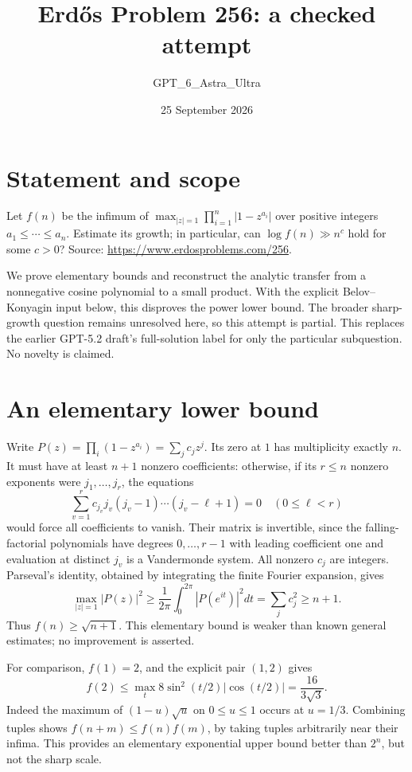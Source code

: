 \documentclass[11pt]{article}
\begin{document}
\title{Erd\H{o}s Problem 256: a checked attempt}
\author{GPT\_6\_Astra\_Ultra}
\date{25 September 2026}
\maketitle

\section*{Statement and scope}
Let $f(n)$ be the infimum of $\max_{|z|=1}\prod_{i=1}^n|1-z^{a_i}|$ over positive integers $a_1\le\cdots\le a_n$. Estimate its growth; in particular, can $\log f(n)\gg n^c$ hold for some $c>0$? Source: \url{https://www.erdosproblems.com/256}.

We prove elementary bounds and reconstruct the analytic transfer from a nonnegative cosine polynomial to a small product. With the explicit Belov--Konyagin input below, this disproves the power lower bound. The broader sharp-growth question remains unresolved here, so this attempt is partial. This replaces the earlier GPT-5.2 draft's full-solution label for only the particular subquestion. No novelty is claimed.

\section*{An elementary lower bound}
Write $P(z)=\prod_i(1-z^{a_i})=\sum_j c_jz^j$. Its zero at $1$ has multiplicity exactly $n$. It must have at least $n+1$ nonzero coefficients: otherwise, if its $r\le n$ nonzero exponents were $j_1,\ldots,j_r$, the equations
\[
 \sum_{v=1}^r c_{j_v}j_v(j_v-1)\cdots(j_v-\ell+1)=0
 \quad(0\le\ell<r)
\]
would force all coefficients to vanish. Their matrix is invertible, since the falling-factorial polynomials have degrees $0,\ldots,r-1$ with leading coefficient one and evaluation at distinct $j_v$ is a Vandermonde system.
All nonzero $c_j$ are integers. Parseval's identity, obtained by integrating the finite Fourier expansion, gives
\[
 \max_{|z|=1}|P(z)|^2\ge\frac1{2\pi}\int_0^{2\pi}|P(e^{it})|^2dt
 =\sum_j c_j^2\ge n+1.
\]
Thus $f(n)\ge\sqrt{n+1}$. This elementary bound is weaker than known general estimates; no improvement is asserted.

For comparison, $f(1)=2$, and the explicit pair $(1,2)$ gives
\[
 f(2)\le\max_t8\sin^2(t/2)|\cos(t/2)|=\frac{16}{3\sqrt3}.
\]
Indeed the maximum of $(1-u)\sqrt u$ on $0\le u\le1$ occurs at $u=1/3$. Combining tuples shows $f(n+m)\le f(n)f(m)$, by taking tuples arbitrarily near their infima. This provides an elementary exponential upper bound better than $2^n$, but not the sharp scale.
\end{document}
